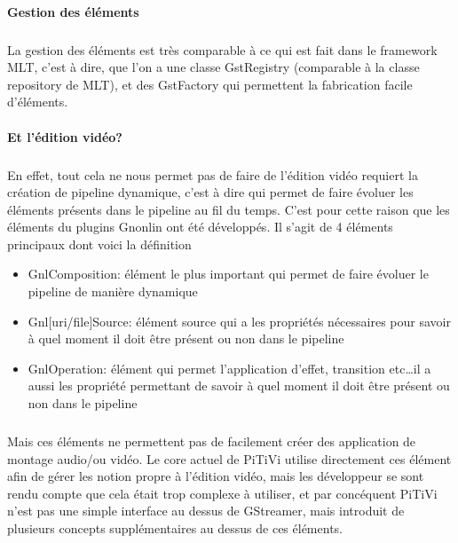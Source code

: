\paragraph{Gestion des éléments}

\subparagraph{}

La gestion des éléments est très comparable à ce qui est fait
dans le framework MLT, c'est à dire, que l'on a une classe GstRegistry
(comparable à la classe repository de MLT), et des GstFactory qui permettent
la fabrication facile d'éléments.

\paragraph{Et l'édition vidéo?}

\subparagraph{}

En effet, tout cela ne nous permet pas de faire  de l'édition vidéo
requiert la création de pipeline dynamique, c'est
à dire qui permet de faire évoluer les éléments présents dans le
pipeline au fil du temps.  C'est pour cette raison que les éléments du plugins Gnonlin
ont été développés. Il s'agit de 4 éléments principaux dont voici la définition

\begin{itemize}

  \item {GnlComposition: élément le plus important qui permet de
  faire évoluer
    le pipeline de manière dynamique}

  \item{Gnl[uri/file]Source: élément source qui a les propriétés
    nécessaires pour savoir à quel moment il doit être présent ou
    non dans le pipeline}

  \item{GnlOperation: élément qui permet l'application d'effet, transition
    etc\ldots il a aussi les propriété permettant de savoir à quel moment il
    doit être présent ou non dans le pipeline}

\end{itemize}

\subparagraph{}

Mais ces éléments ne permettent pas de facilement créer des application
de montage audio/ou vidéo. Le core actuel de PiTiVi utilise directement
ces élément afin de gérer les notion propre à l'édition vidéo,
mais les développeur se sont rendu compte que cela était trop complexe
à utiliser, et par concéquent PiTiVi n'est pas une simple interface au
dessus de GStreamer, mais introduit de plusieurs concepts supplémentaires
au dessus de ces éléments.

